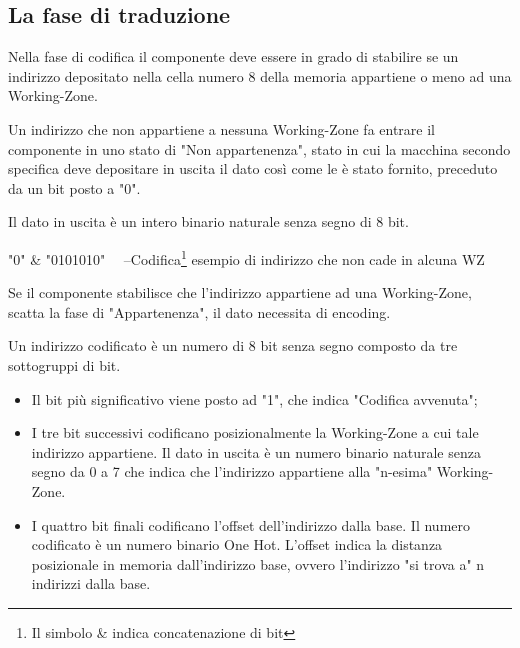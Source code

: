 \documentclass{article}
\newenvironment{gitFont}{\fontfamily{zi4}\selectfont}{\par}
\begin{document}
\subsection{La fase di traduzione}
\begin{flushleft}

Nella fase di codifica il componente deve essere in grado di stabilire se un indirizzo depositato nella cella numero 8 della memoria appartiene o meno ad una Working-Zone.

\medskip

Un indirizzo che non appartiene a nessuna Working-Zone fa entrare il componente in uno stato di "Non appartenenza", stato in cui la macchina secondo specifica deve depositare in uscita il dato così come le è stato fornito, preceduto da un bit posto a "0".
\smallskip

Il dato in uscita è un intero binario naturale senza segno di 8 bit.

\bigskip

\begin{gitFont}

"0" \& "0101010"  \ \  --Codifica\footnote{Il simbolo \& indica concatenazione di bit} esempio di indirizzo che non cade in alcuna WZ

\end{gitFont}



\newpage

Se il componente stabilisce che l'indirizzo appartiene ad una Working-Zone, scatta la fase di "Appartenenza", il dato necessita di encoding.


Un indirizzo codificato è un numero di 8 bit senza segno composto da tre sottogruppi di bit.

\begin{itemize}
\item Il bit più significativo viene posto ad "1", che indica "Codifica avvenuta";
\item I tre bit successivi codificano posizionalmente la Working-Zone a cui tale indirizzo appartiene. Il dato in uscita è un numero binario naturale senza segno da 0 a 7 che indica che l'indirizzo appartiene alla "n-esima" Working-Zone.



\item I quattro bit finali codificano l'offset dell'indirizzo dalla base. Il numero codificato è un numero binario One Hot. L'offset indica la distanza posizionale in memoria dall'indirizzo base, ovvero l'indirizzo "si trova a" n indirizzi dalla base.  %
\end{itemize}


\end{flushleft}
\end{document}
